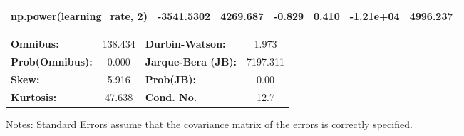 \begin{center}
\begin{tabular}{lcccccc}
\textbf{np.power(learning\_rate, 2)}      &   -3541.5302  &     4269.687     &    -0.829  &         0.410        &    -1.21e+04    &     4996.237     \\
\bottomrule
\end{tabular}
\begin{tabular}{lclc}
\textbf{Omnibus:}       & 138.434 & \textbf{  Durbin-Watson:     } &    1.973  \\
\textbf{Prob(Omnibus):} &   0.000 & \textbf{  Jarque-Bera (JB):  } & 7197.311  \\
\textbf{Skew:}          &   5.916 & \textbf{  Prob(JB):          } &     0.00  \\
\textbf{Kurtosis:}      &  47.638 & \textbf{  Cond. No.          } &     12.7  \\
\bottomrule
\end{tabular}
\end{center}

Notes: \newline
 [1] Standard Errors assume that the covariance matrix of the errors is correctly specified.
